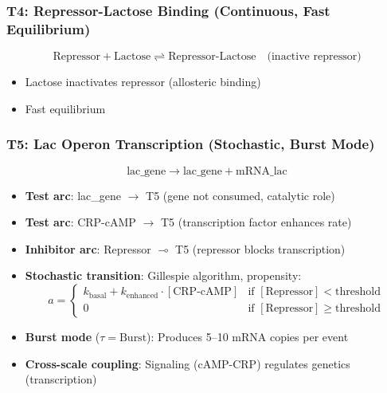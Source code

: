 \subsubsection{T4: Repressor-Lactose Binding (Continuous, Fast Equilibrium)}

\begin{equation}
\text{Repressor} + \text{Lactose} \rightleftharpoons \text{Repressor-Lactose} \quad \text{(inactive repressor)}
\end{equation}

\begin{itemize}
    \item Lactose inactivates repressor (allosteric binding)
    \item Fast equilibrium
\end{itemize}

\subsubsection{T5: Lac Operon Transcription (Stochastic, Burst Mode)}

\begin{equation}
\text{lac\_gene} \to \text{lac\_gene} + \text{mRNA\_lac}
\end{equation}

\begin{itemize}
    \item \textbf{Test arc}: lac\_gene $\to$ T5 (gene not consumed, catalytic role)
    \item \textbf{Test arc}: CRP-cAMP $\to$ T5 (transcription factor enhances rate)
    \item \textbf{Inhibitor arc}: Repressor $\multimap$ T5 (repressor blocks transcription)
    \item \textbf{Stochastic transition}: Gillespie algorithm, propensity:
    \begin{equation}
    a = \begin{cases}
    k_{\text{basal}} + k_{\text{enhanced}} \cdot [\text{CRP-cAMP}] & \text{if } [\text{Repressor}] < \text{threshold} \\
    0 & \text{if } [\text{Repressor}] \geq \text{threshold}
    \end{cases}
    \end{equation}
    \item \textbf{Burst mode} ($\tau = \text{Burst}$): Produces 5--10 mRNA copies per event
    \item \textbf{Cross-scale coupling}: Signaling (cAMP-CRP) regulates genetics (transcription)
\end{itemize}

